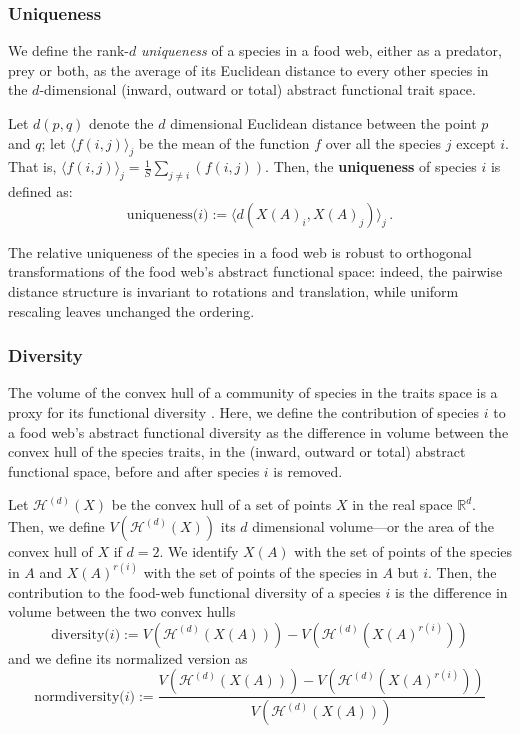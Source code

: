 \documentclass[]{rsos}%
\begin{document}
\subsubsection{Uniqueness}
We define the rank-$d$ \emph{uniqueness} of a species in a food web, either as
a predator, prey or both, as the average of its
Euclidean distance to every other species in the $d$-dimensional (inward, outward or total)
abstract functional trait space.

Let \(d\left(p,q\right)\) denote the \(d\) dimensional Euclidean
distance between the point \(p\) and \(q\); let
\(\langle f(i,j) \rangle_j\) be the mean of the function \(f\) over all
the species \(j\) except \(i\). That is,
\(\langle f(i,j) \rangle_j = \frac{1}{S}\sum_{j \neq i}(f(i,j))\). Then,
the \textbf{uniqueness} of species \(i\) is defined as:
\begin{equation}
\mbox{uniqueness($i$)} := \langle d\left( X(A)_i,X(A)_j\right)\rangle_j \, .
\end{equation}

The relative uniqueness of the species in a food web is robust to orthogonal
transformations of the food web's abstract functional space:
indeed, the pairwise distance structure is invariant to rotations and
translation, while uniform rescaling leaves unchanged the ordering.

\subsubsection{Diversity}
The volume of the convex hull of a community of species in the traits space is a
proxy for its functional diversity \citep{villeger2008new}. Here, we define the
contribution of species $i$ to a food web's abstract functional diversity as
the difference in volume between the convex hull of the species traits, in the
(inward, outward or total) abstract functional space, before and after species $i$ is removed.

Let $\mathcal{H}^{(d)}\left( X \right)$ be the convex hull of a set of points $X$ in
the real space $\mathbb{R}^d$. Then, we define $V\left(\mathcal{H}^{(d)}\left( X \right) \right)$
its $d$ dimensional volume---or the area of the convex hull of $X$ if $d=2$.
We identify $X(A)$ with the set of points of the species in $A$ and $X(A)^{r(i)}$
with the set of points of the species in $A$ but $i$. Then, the contribution
to the food-web functional diversity of a species $i$ is the difference in volume
between the two convex hulls
\begin{equation}
\mbox{diversity($i$)} := V\left(\mathcal{H}^{(d)}\left( X(A) \right) \right) - V\left(\mathcal{H}^{(d)}\left( X(A)^{r(i)} \right) \right)
\end{equation}
and we define its normalized version as
\begin{equation}
\mbox{normdiversity($i$)} := \frac{V\left(\mathcal{H}^{(d)}\left( X(A) \right) \right) - V\left(\mathcal{H}^{(d)}\left( X(A)^{r(i)} \right) \right)}{V\left(\mathcal{H}^{(d)}\left( X(A) \right) \right)}
\end{equation}
\end{document}
